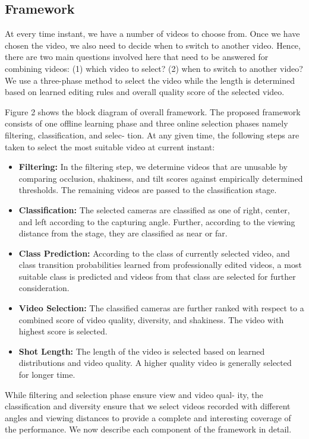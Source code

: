 \documentclass{sig-alternate-05-2015}
\begin{document}
\subsection{Framework}
At every time instant, we have a number of videos to choose
from. Once we have chosen the video, we also need to decide when
to switch to another video. Hence, there are two main questions
involved here that need to be answered for combining videos: (1)
which video to select? (2) when to switch to another video? We
use a three-phase method to select the video while the length is
determined based on learned editing rules and overall quality score
of the selected video.\par
Figure 2 shows the block diagram of overall framework. The
proposed framework consists of one offline learning phase and three
online selection phases namely filtering, classification, and selec-
tion. At any given time, the following steps are taken to select the
most suitable video at current instant:
 \begin{itemize} 
    \item \textbf{Filtering:} In the filtering step, we determine videos that are
unusable by comparing occlusion, shakiness, and tilt scores
against empirically determined thresholds. The remaining
videos are passed to the classification stage.
    \item \textbf{Classification:} The selected cameras are classified as one
of right, center, and left according to the capturing angle.
Further, according to the viewing distance from the stage,
they are classified as near or far.
    \item \textbf{Class Prediction:} According to the class of currently selected video, and class transition probabilities learned from
professionally edited videos, a most suitable class is predicted and videos from that class are selected for further consideration.
    \item \textbf{Video Selection:} The classified cameras are further ranked
with respect to a combined score of video quality, diversity,
and shakiness. The video with highest score is selected.
    \item \textbf{Shot Length:} The length of the video is selected based on
learned distributions and video quality. A higher quality video
is generally selected for longer time.
 \end{itemize} \par
While filtering and selection phase ensure view and video qual-
ity, the classification and diversity ensure that we select videos
recorded with different angles and viewing distances to provide a
complete and interesting coverage of the performance. We now
describe each component of the framework in detail.
\end{document}
